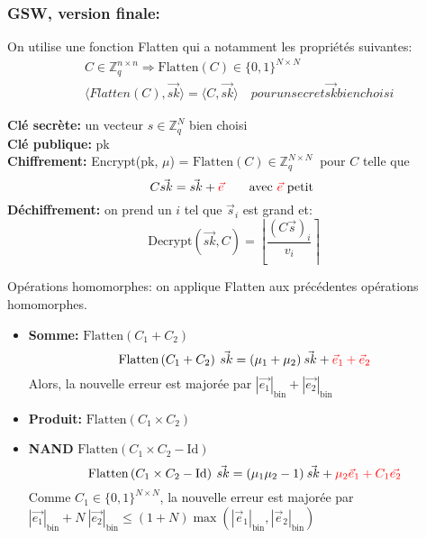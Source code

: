 \documentclass[10pt,xcolor={usenames,dvipsnames}]{beamer}
\newcommand{\ZZq}{\mathbb{Z}_q}
\newcommand{\bnorm}[1]{{|#1|}_{\text{bin}}}
\begin{document}
\begin{frame} 
\frametitle{GSW, version finale:}
On utilise une fonction Flatten qui a notamment les propriétés suivantes:
\begin{align*}
&C \in \ZZq^{n \times n} \Rightarrow \text{Flatten}(C) \in \{0,1\}^{N \times N} \\
& \langle Flatten(C), \vec{sk} \rangle = \langle C, \vec{sk} \rangle \quad{ pour un secret \vec{sk} bien choisi}
\end{align*}

\textbf{Clé secrète:} un vecteur $s \in \ZZq^{N}$ bien choisi\\
\textbf{Clé publique:} pk\\
\textbf{Chiffrement:} Encrypt(pk, $\mu$) = $\text{Flatten}(C)\in \ZZq^{N \times N}\:$ pour $C$ telle que  
\[C \vec{sk} = \vec{sk} + {\color{red}\vec{e}}\qquad \text{avec }  {\color{red}\vec{e}} \text{ petit} \]
\textbf{Déchiffrement:} on prend un $i$ tel que $\vec{s}_i$ est grand et:
\[\text{Decrypt}(\vec{sk}, C) = \left\lfloor \frac{{\left(C\vec{s}\right)}_i}{v_i} \right\rceil \]

Opérations homomorphes: on applique Flatten aux précédentes opérations homomorphes.

\begin{itemize}
\item \textbf{Somme:} $\text{Flatten}\left(C_1 + C_2\right)\quad$ \\
\[\text{Flatten}\left(C_1 + C_2\right)\: \vec{sk} = (\mu_1 + \mu_2)\:\vec{sk} + {\color{red}\vec{e}_1 + \vec{e}_2}\]
Alors, la nouvelle erreur est majorée par $\bnorm{\vec{e_1}} + \bnorm{\vec{e_2}}$
\item \textbf{Produit:} $\text{Flatten}\left(C_1 \times C_2\right)\quad$ \\
\item \textbf{NAND} $\text{Flatten}\left(C_1 \times C_2 - \text{Id}\right)\quad$ \\
\[\text{Flatten}\left(C_1 \times C_2 - \text{Id}\right)\: \vec{sk} = (\mu_1 \mu_2 - 1)\: \vec{sk} + {\color{red}\mu_2 \vec{e}_1 + C_1 \vec{e_2}}\]
Comme $C_1 \in \{0,1\}^{N\times N}$, la nouvelle erreur est majorée par 
$\bnorm{\vec{e_1}} + N\:\bnorm{\vec{e_2}} \leqslant (1+N) \max\left(\bnorm{\vec{e}_1},\bnorm{\vec{e}_2}\right)$
\end{itemize}
\end{frame} 
  
  
\end{document}
